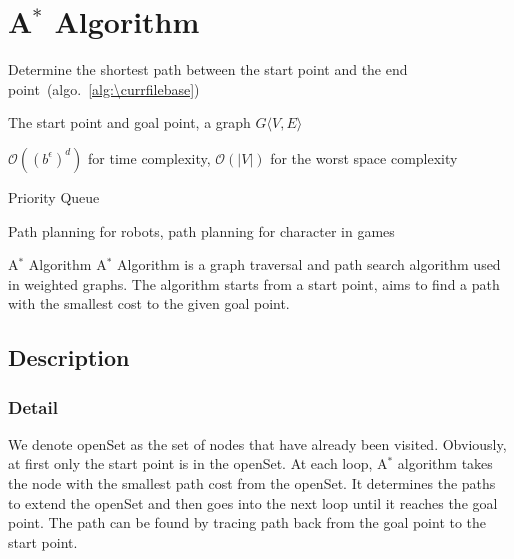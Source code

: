\documentclass[catalog.tex]{subfiles}
\begin{document}
\def\pbname{A$^*$ Algorithm} %

\section{\pbname} 

\begin{overview}
\item [Algorithm:] Determine the shortest path between the start point and the end point~(algo.~\ref{alg:\currfilebase})
\item [Input:] The start point and goal point, a graph $G \langle V,E \rangle$
\item [Complexity:]$\mathcal{O}((b^{\epsilon})^d)$ for time complexity, $\mathcal{O}(|V|)$ for the worst space complexity
\item [Data structure compatibility:] Priority Queue
\item [Common applications:] Path planning for robots, path planning for character in games
\end{overview}


\begin{problem}{\pbname}
	A$^*$ Algorithm is a graph traversal and path search algorithm used in weighted graphs. The algorithm starts from a start point, aims to find a path with the smallest cost to the given goal point.
\end{problem}

\subsection*{Description}
\subsubsection*{Detail}
\par We denote openSet as the set of nodes that have already been visited. Obviously, at first only the start point is in the openSet. At each loop, A$^*$ algorithm takes the node with the smallest path cost from the openSet. It determines the paths to extend the openSet and then goes into the next loop until it reaches the goal point. The path can be found by tracing path back from the goal point to the start point.
\end{document}
